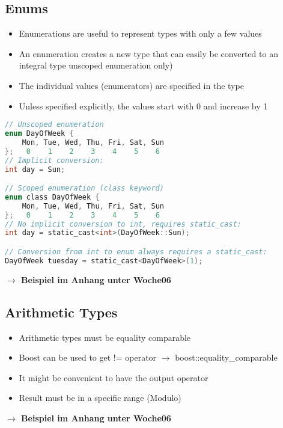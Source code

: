 \subsection{Enums}
\begin{itemize}
    \item Enumerations are useful to represent types with only a few values
    \item An enumeration creates a new type that can easily be converted to an integral type unscoped enumeration only)
    \item The individual values (enumerators) are specified in the type
    \item Unless specified explicitly, the values start with 0 and increase by 1
\end{itemize}

\begin{lstlisting}[style=frame, style= linenumbers, language=C]
// Unscoped enumeration
enum DayOfWeek {
    Mon, Tue, Wed, Thu, Fri, Sat, Sun
};   0    1    2    3    4    5    6
// Implicit conversion:
int day = Sun;

// Scoped enumeration (class keyword)
enum class DayOfWeek {
    Mon, Tue, Wed, Thu, Fri, Sat, Sun
};   0    1    2    3    4    5    6
// No implicit conversion to int, requires static_cast:
int day = static_cast<int>(DayOfWeek::Sun);

// Conversion from int to enum always requires a static_cast:
DayOfWeek tuesday = static_cast<DayOfWeek>(1);
\end{lstlisting}
\vspace{0.3cm}
\textbf{$\rightarrow$ Beispiel im Anhang unter Woche06}

\subsection{Arithmetic Types}
\begin{itemize}
    \item Arithmetic types must be equality comparable
    \item Boost can be used to get != operator $\rightarrow$ boost::equality\_comparable
    \item It might be convenient to have the output operator
    \item Result must be in a specific range (Modulo)
\end{itemize}
\vspace{0.3cm}
\textbf{$\rightarrow$ Beispiel im Anhang unter Woche06}


